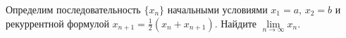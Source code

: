 \documentclass{article}
\begin{document}
Определим последовательность $\{x_n\}$ начальными условиями $x_1=a$, $x_2=b$ и рекуррентной формулой $x_{n+1} = \frac12 (x_n + x_{n+1})$. 
Найдите $\lim\limits_{n\to \infty} x_n$.
\end{document}
